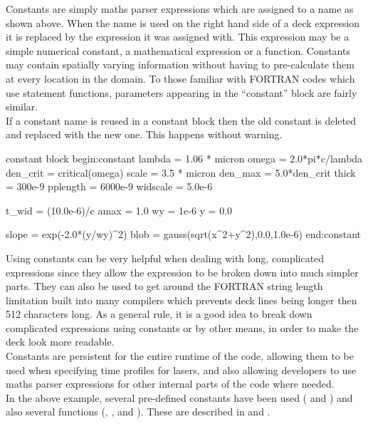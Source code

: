 Constants are simply maths parser expressions which are assigned to a name as
shown above. When the name is used on the right hand side of a deck expression
it is replaced by the expression it was assigned with. This expression may
be a simple numerical constant, a mathematical expression or a function.
Constants may contain spatially varying information without having to
pre-calculate them at every location in the domain.
To those familiar with FORTRAN codes which use statement functions, parameters
appearing in the ``constant'' block are fairly similar.\\

If a constant name is reused in a constant block then the old constant is
deleted and replaced with the new one. This happens without warning.
\begin{lboxverbatim}{constant block}
begin:constant
   lambda = 1.06 * micron
   omega = 2.0*pi*c/lambda
   den_crit = critical(omega)
   scale = 3.5 * micron
   den_max = 5.0*den_crit
   thick = 300e-9
   pplength = 6000e-9
   widscale = 5.0e-6

   t_wid = (10.0e-6)/c
   amax = 1.0
   wy = 1e-6
   y = 0.0

   slope = exp(-2.0*(y/wy)^2)
   blob = gauss(sqrt(x^2+y^2),0.0,1.0e-6)
end:constant
\end{lboxverbatim}

Using constants can be very helpful when dealing with long,
complicated expressions since they allow the expression to be broken down into
much simpler parts. They can also be used to get around the FORTRAN string
length limitation built into many compilers which prevents deck lines being
longer then 512 characters long. As a general rule, it is a good idea to break
down complicated expressions using constants or by other means, in order to
make the deck look more readable.\\

Constants are persistent for the entire runtime of the code,
allowing them to be used when specifying time profiles for lasers, and also
allowing developers to use maths parser expressions for other internal parts of
the code where needed.\\

In the above example, several pre-defined constants have been used
( and ) and also several functions
(, ,  and
). These are described in  and
.


